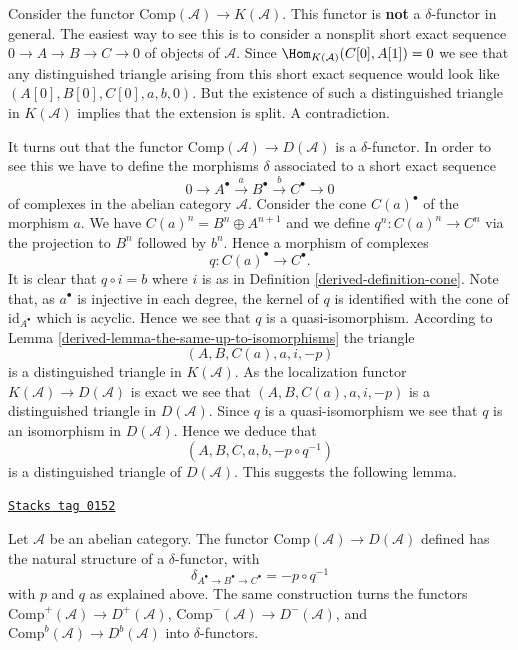 \medskip\noindent
Consider the functor
$\text{Comp}(\mathcal{A}) \to K(\mathcal{A})$.
This functor is {\bf not} a $\delta$-functor in general.
The easiest way to see this is to consider a nonsplit
short exact sequence $0 \to A \to B \to C \to 0$
of objects of $\mathcal{A}$. Since
$\Hom_{K(\mathcal{A})}(C[0], A[1]) = 0$
we see that any distinguished triangle arising from
this short exact sequence would look like
$(A[0], B[0], C[0], a, b, 0)$. But the existence of such a
distinguished triangle in $K(\mathcal{A})$ implies
that the extension is split. A contradiction.

\medskip\noindent
It turns out that the functor
$\text{Comp}(\mathcal{A}) \to D(\mathcal{A})$ is a
$\delta$-functor. In order to see this we have to define
the morphisms $\delta$ associated to a short exact sequence
$$
0 \to A^\bullet \xrightarrow{a} B^\bullet \xrightarrow{b} C^\bullet \to 0
$$
of complexes in the abelian category $\mathcal{A}$.
Consider the cone $C(a)^\bullet$ of the morphism $a$.
We have $C(a)^n = B^n \oplus A^{n + 1}$ and we define
$q^n : C(a)^n \to C^n$ via the projection to $B^n$ followed
by $b^n$. Hence a morphism of complexes
$$
q : C(a)^\bullet \longrightarrow C^\bullet.
$$
It is clear that $q \circ i = b$ where $i$ is as in
Definition \ref{derived-definition-cone}.
Note that, as $a^\bullet$ is injective in each degree,
the kernel of $q$ is identified with the cone of
$\text{id}_{A^\bullet}$ which is acyclic. Hence we see that
$q$ is a quasi-isomorphism. According to
Lemma \ref{derived-lemma-the-same-up-to-isomorphisms}
the triangle
$$
(A, B, C(a), a, i, -p)
$$
is a distinguished triangle in $K(\mathcal{A})$.
As the localization functor
$K(\mathcal{A}) \to D(\mathcal{A})$ is
exact we see that $(A, B, C(a), a, i, -p)$ is a distinguished
triangle in $D(\mathcal{A})$. Since $q$ is a quasi-isomorphism
we see that $q$ is an isomorphism in $D(\mathcal{A})$.
Hence we deduce that
$$
(A, B, C, a, b, -p \circ q^{-1})
$$
is a distinguished triangle of $D(\mathcal{A})$.
This suggests the following lemma.

\begin{lemma}
\label{derived-lemma-derived-canonical-delta-functor}
\href{https://stacks.math.columbia.edu/tag/0152}{\texttt{Stacks tag 0152}}

Let $\mathcal{A}$ be an abelian category. The functor
$\text{Comp}(\mathcal{A}) \to D(\mathcal{A})$
defined has the natural structure of a $\delta$-functor,
with
$$
\delta_{A^\bullet \to B^\bullet \to C^\bullet} = - p \circ q^{-1}
$$
with $p$ and $q$ as explained above. The same construction turns the
functors
$\text{Comp}^{+}(\mathcal{A}) \to D^{+}(\mathcal{A})$,
$\text{Comp}^{-}(\mathcal{A}) \to D^{-}(\mathcal{A})$, and
$\text{Comp}^b(\mathcal{A}) \to D^b(\mathcal{A})$
into $\delta$-functors.
\end{lemma}

